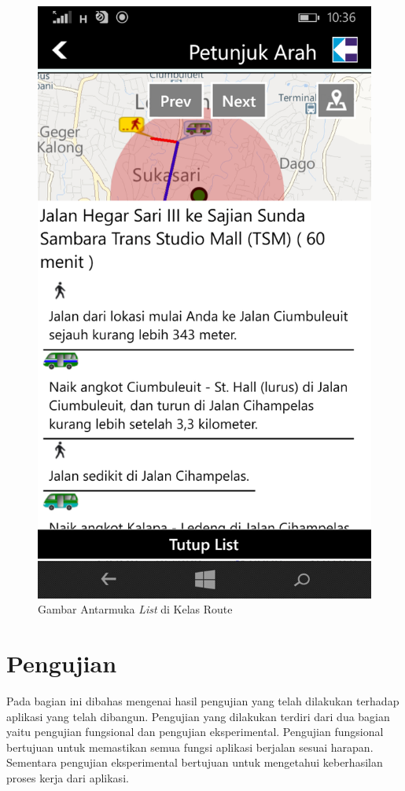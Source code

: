 	\newpage
	\begin{figure}[!h]
		\centering
			\includegraphics[scale=0.25]{Gambar/antarmuka/list_route}
		\caption{Gambar Antarmuka \textit{List} di Kelas Route}
		\label{fig:antarmuka list Route}
	\end{figure}

\newpage

\section{Pengujian}
\label{lab:Pengujian}
\hspace{0.5cm} Pada bagian ini dibahas mengenai hasil pengujian yang telah dilakukan terhadap aplikasi yang telah dibangun. Pengujian yang dilakukan terdiri dari dua bagian yaitu pengujian fungsional dan pengujian eksperimental. Pengujian fungsional bertujuan untuk memastikan semua fungsi aplikasi berjalan sesuai harapan. Sementara pengujian eksperimental bertujuan untuk mengetahui keberhasilan proses kerja dari aplikasi.

